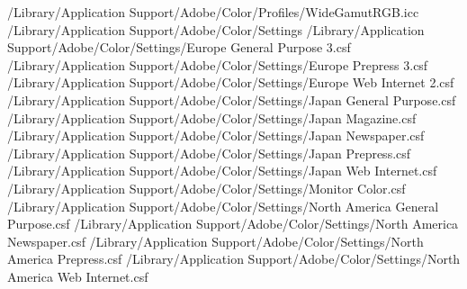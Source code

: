 /Library/Application Support/Adobe/Color/Profiles/WideGamutRGB.icc
/Library/Application Support/Adobe/Color/Settings
/Library/Application Support/Adobe/Color/Settings/Europe General Purpose 3.csf
/Library/Application Support/Adobe/Color/Settings/Europe Prepress 3.csf
/Library/Application Support/Adobe/Color/Settings/Europe Web Internet 2.csf
/Library/Application Support/Adobe/Color/Settings/Japan General Purpose.csf
/Library/Application Support/Adobe/Color/Settings/Japan Magazine.csf
/Library/Application Support/Adobe/Color/Settings/Japan Newspaper.csf
/Library/Application Support/Adobe/Color/Settings/Japan Prepress.csf
/Library/Application Support/Adobe/Color/Settings/Japan Web Internet.csf
/Library/Application Support/Adobe/Color/Settings/Monitor Color.csf
/Library/Application Support/Adobe/Color/Settings/North America General Purpose.csf
/Library/Application Support/Adobe/Color/Settings/North America Newspaper.csf
/Library/Application Support/Adobe/Color/Settings/North America Prepress.csf
/Library/Application Support/Adobe/Color/Settings/North America Web Internet.csf



